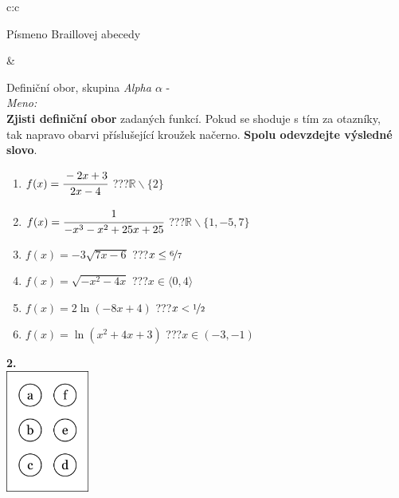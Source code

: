 \documentclass[10pt]{report}
\begin{document}
\begin{tabular}{c:c}
\begin{minipage}[c][99mm][t]{0.49\linewidth}
\begin{center}
\begin{minipage}{0.20\linewidth}
\begin{center}
{\small Písmeno Braillovej abecedy}
\end{center}
\end{minipage}
\end{center}
\end{minipage}
&
\begin{minipage}[c][99mm][t]{0.49\linewidth}
\begin{center}
\vspace{7mm}
{\huge Definiční obor, skupina \textit{Alpha $\alpha$} -}\\[4.5mm]
\textit{Meno:}\phantom{xxxxxxxxxxxxxxxxxxxxxxxxxxxxxxxxxxxxxxxxxxxxxxxxxxxxxxxxxxxxxxxxx}\\[3.5mm]
\textbf{Zjisti definiční obor} zadaných funkcí. Pokud se shoduje s tím za otazníky,\\tak napravo obarvi příslušející kroužek načerno. \textbf{Spolu odevzdejte výsledné slovo}.\\[3mm]
\begin{minipage}{0.77\linewidth}
\begin{center}
\begin{varwidth}{\textwidth}
\begin{enumerate}
\normalsize
\item $f(x)=\cfrac{-2x+3}{2x-4}$\quad \dotfill\; ???\;\dotfill \quad $\mathbb{R}\smallsetminus\{2\}$
\item $f(x)=\cfrac{1}{-x^3-x^2+25x+25}$\quad \dotfill\; ???\;\dotfill \quad $\mathbb{R}\smallsetminus\{1,-5,7\}$
\item $f(x)=-3\sqrt{7x-6}$\quad \dotfill\; ???\;\dotfill \quad $x\leq\nicefrac{6}{7}$
\item $f(x)=\sqrt{-x^2-4x}$\quad \dotfill\; ???\;\dotfill \quad $x\in\langle0 , 4\rangle$
\item $f(x)=2\ln{(-8x+4)}$\quad \dotfill\; ???\;\dotfill \quad $x<\nicefrac{1}{2}$
\item $f(x)=\ln{(x^2+4x+3)}$\quad \dotfill\; ???\;\dotfill \quad $x\in(-3 , -1)$
\end{enumerate}
\end{varwidth}
\end{center}
\end{minipage}
\begin{minipage}{0.20\linewidth}
\begin{center}
{\Huge\bfseries 2.} \\[2mm]
\includegraphics[height=40mm]{../images/braille.png}

\end{center}
\end{minipage}
\end{center}
\end{minipage}
\end{tabular}
\end{document}

